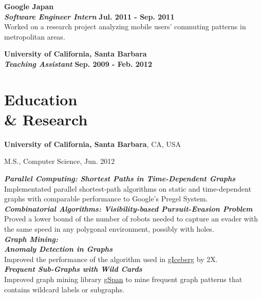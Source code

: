 \documentclass[margin,line]{res}
\newenvironment{list1}{
  \begin{list}{\ding{113}}{%
      \setlength{\itemsep}{0in}
      \setlength{\parsep}{0in} \setlength{\parskip}{0in}
      \setlength{\topsep}{0in} \setlength{\partopsep}{0in}
      \setlength{\leftmargin}{0.17in}}}{\end{list}}
\begin{document}
\begin{resume}
{\bf{Google Japan}}\\
{\bf{\em Software Engineer Intern}} \hfill {\bf Jul. 2011 - Sep. 2011}\\
Worked on a research project analyzing mobile users' commuting patterns in metropolitan areas.

{\bf{University of California, Santa Barbara}}\\
{\bf{\em Teaching Assistant}} \hfill {\bf Sep. 2009 - Feb. 2012}

\section{\sc Education\\\& Research}
{\bf University of California, Santa Barbara}, CA, USA\\
\vspace*{-.1in}
\begin{list1}
\item[] M.S., Computer Science, Jun. 2012
\end{list1}

\vspace*{-.1in}
{\bf{\em Parallel Computing: Shortest Paths in Time-Dependent Graphs}}\\
Implementated parallel shortest-path algorithms on static and time-dependent graphs with comparable performance to Google's Pregel System.\\

\vspace*{-.2in}
{\bf{\em Combinatorial Algorithms: Visibility-based Pursuit-Evasion Problem}}\\
Proved a lower bound of the number of robots needed to capture an evader with the same speed in any polygonal environment, possibly with holes.\\

\vspace*{-.2in}
{\bf{\em Graph Mining:\\\hspace*{.2in}Anomaly Detection in Graphs}}\\
Improved the performance of the algorithm used in \href{https://drive.google.com/open?id=1TMkCJGdvBT6-96O487QWsjsFdTMqDxQT}{gIceberg} by 2X.\\
{\bf{\em \hspace*{.2in}Frequent Sub-Graphs with Wild Cards}}\\
Improved graph mining library \href{https://www.cs.ucsb.edu/~xyan/software/gSpan.htm}{gSpan} to mine frequent graph patterns that contains wildcard labels or subgraphs.


\end{resume}
\end{document}

